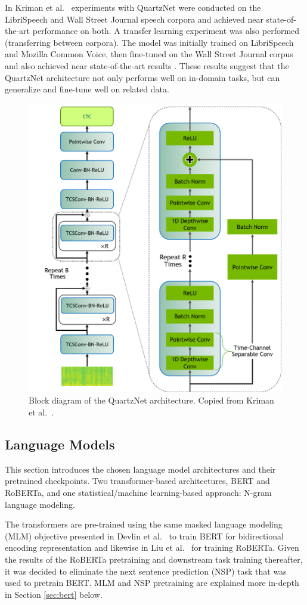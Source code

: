 \documentclass[12pt]{article}
\begin{document}
In Kriman et al.~\cite{kriman_quartznet_2020} experiments with QuartzNet were conducted on the LibriSpeech and Wall Street Journal speech corpora and
achieved near state-of-the-art performance on both. A transfer learning experiment was also performed (transferring between corpora). The model was
initially trained on LibriSpeech and Mozilla Common Voice, then fine-tuned on the Wall Street Journal corpus and also achieved near state-of-the-art
results \cite{kriman_quartznet_2020}. These results suggest that the QuartzNet architecture not only performs well on in-domain tasks, but can
generalize and fine-tune well on related data.

\begin{figure}
    \centering
    \includegraphics[width=0.5\linewidth]{figures/quartz_vertical.png}
    \caption{Block diagram of the QuartzNet architecture. Copied from Kriman et al.~\cite{kriman_quartznet_2020}.}
    \label{fig:quartznet}
\end{figure}

\subsection{Language Models}\label{sec:language_models}
This section introduces the chosen language model architectures and their pretrained checkpoints. Two transformer-based architectures, BERT and
RoBERTa, and one statistical/machine learning-based approach: N-gram language modeling.

The transformers are pre-trained using the same masked language modeling (MLM) objective presented in Devlin et al.~\cite{devlin_bert_2019} to train
BERT for bidirectional encoding representation and likewise in Liu et al.~\cite{liu_roberta_2019} for training RoBERTa. Given the results of the
RoBERTa pretraining and downstream task training thereafter, it was decided to eliminate the next sentence prediction (NSP) task that was used to
pretrain BERT. MLM and NSP pretraining are explained more in-depth in Section \ref{sec:bert} below.
\end{document}
